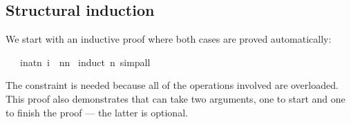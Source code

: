 \begin{isabellebody}
\begin{isamarkuptext}
\subsection{Structural induction}

We start with an inductive proof where both cases are proved automatically:%
\end{isamarkuptext}%
\isamarkuptrue%
\isamarkupfalse%
\ {}{}\ {}\ {}{}i{}{}nat{}n{}\ i{}\ {}\ n{}{}n{}{}{}{}\isanewline
%
\isadelimproof
%
\endisadelimproof
%
\isatagproof
{}\isamarkupfalse%
\ {}induct\ n{}\ simp{}all%
\endisatagproof
{\isafoldproof}%
%
\isadelimproof
%
\endisadelimproof
%
\begin{isamarkuptext}%
\noindent The constraint  is needed because all of
the operations involved are overloaded.
This proof also demonstrates that  can take two arguments,
one to start and one to finish the proof --- the latter is optional.


\end{isamarkuptext}
\end{isabellebody}
